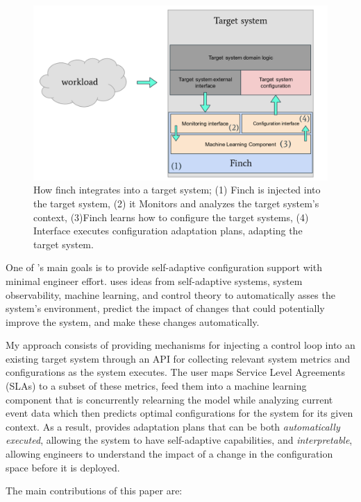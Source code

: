 \begin{figure}[!htb]
	\includegraphics[scale=0.2]{images/finch.png}
  \caption{How finch integrates into a target system; (1) Finch is injected into the target system, (2) it Monitors and analyzes the target system’s context, (3)Finch learns how to configure the target systems, (4) Interface executes configuration adaptation plans, adapting the target system.
}
  \label{fig:finch}  
\end{figure}

One of \projectname{}'s main goals is to provide self-adaptive configuration support with minimal engineer effort. \projectname{} uses ideas from self-adaptive systems, system observability, machine learning, and control theory to automatically asses the system's environment, predict the impact of changes that could potentially improve the system, and make these changes automatically.

My approach consists of providing mechanisms for injecting a control loop into an existing target system through an API for collecting relevant system metrics and configurations as the system executes. The user maps Service Level Agreements (SLAs) to a subset of these metrics, feed them into a machine learning component that is concurrently relearning the model while analyzing current event data which then predicts optimal configurations for the system for its given context. As a result, \projectname{} provides adaptation plans that can be both \emph{automatically executed}, allowing the system to have self-adaptive capabilities, and \emph{interpretable}, allowing engineers to understand the impact of a change in the configuration space before it is deployed.

The main contributions of this paper are:

